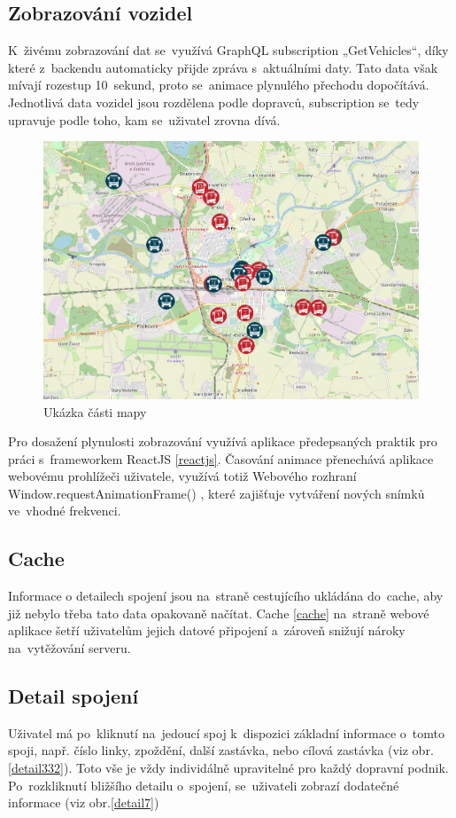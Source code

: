 \subsection{Zobrazování vozidel}
K~živému zobrazování dat se~využívá GraphQL subscription „GetVehicles“, díky které z~backendu automaticky přijde zpráva s~aktuálními daty. Tato data však mívají rozestup 10~sekund, proto se~animace plynulého přechodu dopočítává. Jednotlivá data vozidel jsou rozdělena podle dopravců, subscription se~tedy upravuje podle toho, kam se~uživatel zrovna dívá.
\begin{figure}[H]
    \centering
    \includegraphics[width=1\textwidth]{images/Screenshot from 2023-03-18 20-15-00.png}
    \caption{Ukázka části mapy}
    \label{mapa}
\end{figure}

Pro dosažení plynulosti zobrazování využívá aplikace předepsaných praktik pro práci s~frameworkem ReactJS \ref{reactjs}. Časování animace přenechává aplikace webovému prohlížeči uživatele, využívá totiž Webového rozhraní Window.requestAnimationFrame() \cite{animationframe}, které zajišťuje vytváření nových snímků ve~vhodné frekvenci.
\subsection{Cache}
Informace o detailech spojení jsou na~straně cestujícího ukládána do~cache, aby již nebylo třeba tato data opakovaně načítat. Cache \ref{cache} na~straně webové aplikace šetří uživatelům jejich datové připojení a~zároveň snižují nároky na~vytěžování serveru.

\subsection{Detail spojení}
Uživatel má po~kliknutí na~jedoucí spoj k~dispozici základní informace o~tomto spoji, např. číslo linky, zpoždění, další zastávka, nebo cílová zastávka (viz obr.\ref{detail332}). Toto vše je vždy individálně upravitelné pro každý dopravní podnik. Po~rozkliknutí bližšího detailu o~spojení, se~uživateli zobrazí dodatečné informace (viz obr.\ref{detail7})

